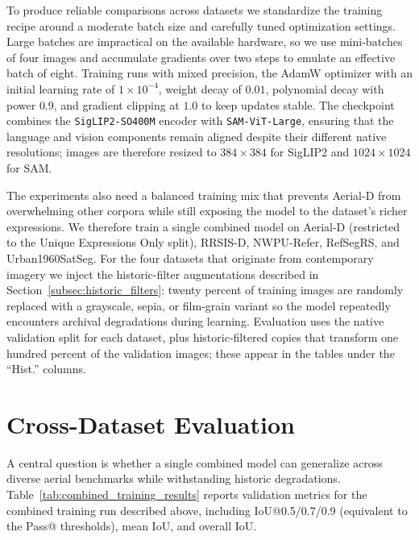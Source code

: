 To produce reliable comparisons across datasets we standardize the training recipe around a moderate batch size and carefully tuned optimization settings. Large batches are impractical on the available hardware, so we use mini-batches of four images and accumulate gradients over two steps to emulate an effective batch of eight. Training runs with mixed precision, the AdamW optimizer with an initial learning rate of $1\times 10^{-4}$, weight decay of $0.01$, polynomial decay with power $0.9$, and gradient clipping at $1.0$ to keep updates stable. The checkpoint combines the \texttt{SigLIP2-SO400M} encoder with \texttt{SAM-ViT-Large}, ensuring that the language and vision components remain aligned despite their different native resolutions; images are therefore resized to $384\times384$ for SigLIP2 and $1024\times1024$ for SAM.

The experiments also need a balanced training mix that prevents Aerial-D from overwhelming other corpora while still exposing the model to the dataset's richer expressions. We therefore train a single combined model on Aerial-D (restricted to the Unique Expressions Only split), RRSIS-D, NWPU-Refer, RefSegRS, and Urban1960SatSeg. For the four datasets that originate from contemporary imagery we inject the historic-filter augmentations described in Section~\ref{subsec:historic_filters}: twenty percent of training images are randomly replaced with a grayscale, sepia, or film-grain variant so the model repeatedly encounters archival degradations during learning. Evaluation uses the native validation split for each dataset, plus historic-filtered copies that transform one hundred percent of the validation images; these appear in the tables under the ``Hist.'' columns.

\section{Cross-Dataset Evaluation}

A central question is whether a single combined model can generalize across diverse aerial benchmarks while withstanding historic degradations. Table~\ref{tab:combined_training_results} reports validation metrics for the combined training run described above, including IoU@0.5/0.7/0.9 (equivalent to the Pass@ thresholds), mean IoU, and overall IoU.

